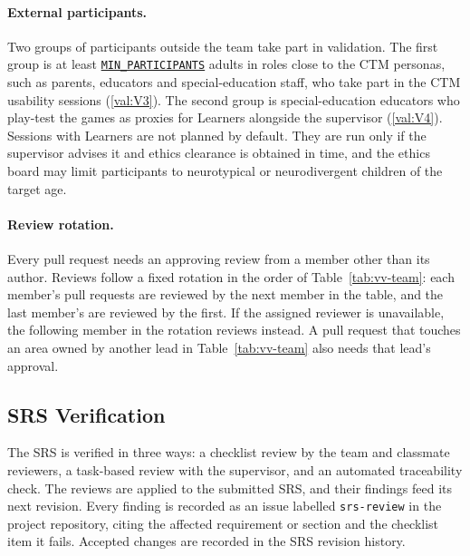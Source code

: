 \documentclass[12pt, titlepage]{article}
\newcounter{validation}
\newcommand{\valref}[1]{\hyperref[val:V#1]{\ref*{val:V#1}}}
\newcommand{\paramref}[2]{\hyperlink{param:#1}{\texttt{#2}}}
\begin{document}
\paragraph{External participants.} Two groups of participants outside the team take part in validation. The first group is at least \paramref{min-participants}{MIN\_PARTICIPANTS} adults in roles close to the CTM personas, such as parents, educators and special-education staff, who take part in the CTM usability sessions (\valref{3}). The second group is special-education educators who play-test the games as proxies for Learners alongside the supervisor (\valref{4}). Sessions with Learners are not planned by default. They are run only if the supervisor advises it and ethics clearance is obtained in time, and the ethics board may limit participants to neurotypical or neurodivergent children of the target age.

\paragraph{Review rotation.} Every pull request needs an approving review from a member other than its author. Reviews follow a fixed rotation in the order of Table~\ref{tab:vv-team}: each member's pull requests are reviewed by the next member in the table, and the last member's are reviewed by the first. If the assigned reviewer is unavailable, the following member in the rotation reviews instead. A pull request that touches an area owned by another lead in Table~\ref{tab:vv-team} also needs that lead's approval.

\subsection{SRS Verification}
\label{sec:srs-ver}

The SRS is verified in three ways: a checklist review by the team and classmate reviewers, a task-based review with the supervisor, and an automated traceability check. The reviews are applied to the submitted SRS, and their findings feed its next revision. Every finding is recorded as an issue labelled \texttt{srs-review} in the project repository, citing the affected requirement or section and the checklist item it fails. Accepted changes are recorded in the SRS revision history.
\end{document}
